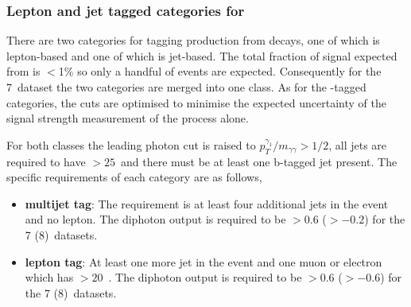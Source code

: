 \subsubsection{Lepton and jet tagged categories for \ttH}
\label{sec:tth_tag}

There are two categories for tagging production from \ttH decays, one of which is lepton-based and one of which is jet-based. The total fraction of signal expected from \ttH is $<$1\% so only a handful of events are expected. Consequently for the 7~\TeV dataset the two categories are merged into one class. As for the \VH-tagged categories, the cuts are optimised to minimise the expected uncertainty of the signal strength measurement of the \ttH process alone.

For both classes the leading photon \pT cut is raised to $p_{T}^{\gamma_{1}}/m_{\gamma\gamma}>1/2$, all jets are required to have \pT$>25$~\GeV and there must be at least one b-tagged jet present. The specific requirements of each category are as follows,

\begin{itemize}
  \item \textbf{\ttH multijet tag}: The requirement is at least four additional jets in the event and no lepton. The diphoton \BDT output is required to be $>0.6$ ($>-0.2$) for the 7 (8)~\TeV datasets. 
  \item \textbf{\ttH lepton tag}: At least one more jet in the event and one muon or electron which has \pT$>20$~\GeV. The diphoton \BDT output is required to be $>0.6$ ($>-0.6$) for the 7 (8)~\TeV datasets.  
\end{itemize}



